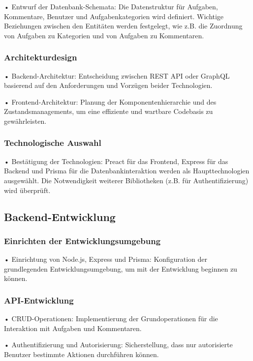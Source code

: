 \documentclass[12pt,a4paper]{article} %
\begin{document}
•	Entwurf der Datenbank-Schemata: Die Datenstruktur für Aufgaben, Kommentare, Benutzer und Aufgabenkategorien wird definiert. Wichtige Beziehungen zwischen den Entitäten werden festgelegt, wie z.B. die Zuordnung von Aufgaben zu Kategorien und von Aufgaben zu Kommentaren.

\subsubsection*{Architekturdesign}

•	Backend-Architektur: Entscheidung zwischen REST API oder GraphQL basierend auf den Anforderungen und Vorzügen beider Technologien.

•	Frontend-Architektur: Planung der Komponentenhierarchie und des Zustandsmanagements, um eine effiziente und wartbare Codebasis zu gewährleisten.

\subsubsection*{Technologische Auswahl}

•	Bestätigung der Technologien: Preact für das Frontend, Express für das Backend und Prisma für die Datenbankinteraktion werden als Haupttechnologien ausgewählt. Die Notwendigkeit weiterer Bibliotheken (z.B. für Authentifizierung) wird überprüft.

\subsection{Backend-Entwicklung}

\subsubsection*{Einrichten der Entwicklungsumgebung}

•	Einrichtung von Node.js, Express und Prisma: Konfiguration der grundlegenden Entwicklungsumgebung, um mit der Entwicklung beginnen zu können.

\subsubsection*{ API-Entwicklung}

•	    CRUD-Operationen: Implementierung der Grundoperationen für die Interaktion mit Aufgaben und Kommentaren.

•	    Authentifizierung und Autorisierung: Sicherstellung, dass nur autorisierte Benutzer bestimmte Aktionen durchführen können.
\end{document}
